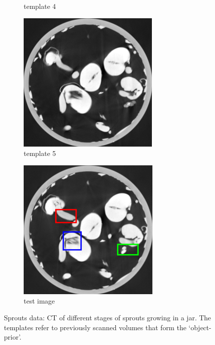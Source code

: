 \documentclass{article}
\begin{document}
\begin{figure}[h]
\begin{subfigure}[b]{0.3\linewidth}
        \caption{template 4}
     \end{subfigure}
\quad
    \begin{subfigure}[b]{0.3\linewidth}
        \includegraphics[width=\textwidth]{../images/supplementary/2D_sprouts/template5.png}
        \caption{template 5}
     \end{subfigure}
\quad
    \begin{subfigure}[b]{0.3\linewidth}
        \includegraphics[width=\textwidth]{../images/supplementary/2D_sprouts/colorTestIm.png}
        \caption{test image}
     \end{subfigure}
      \caption{Sprouts data: CT of different stages of sprouts growing in a jar. The templates refer to previously scanned volumes that form the `object-prior'.}
\label{fig:joint}
\end{figure}
\end{document}
